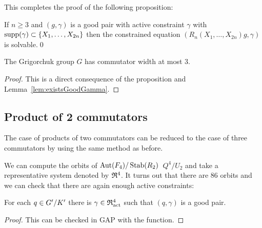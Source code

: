 \documentclass[a4paper,11pt]{amsart}
\newcommand\replace[2]{\st{#1}{\color{Green4}\ #2}}
\begin{document}
This completes the proof of the following proposition:
\begin{pro}\label{pro:solvableConstraintedEquations}
 If $n\geq3$ and $(g,\gamma)$ is a good pair with active constraint $\gamma$ with $\operatorname{{supp}}(\gamma)\subset\{X_1,\dotsc,X_{2n}\}$
 then the constrained equation $(R_n(X_1,\dotsc,X_{2n})g,\gamma)$ is solvable.\qed
\end{pro}
\begin{cor}
 The Grigorchuk group $G$ has commutator width at most $3$.
\end{cor}
\begin{proof}
 This is a direct consequence of the proposition and Lemma~\ref{lem:existsGoodGamma}.
\end{proof}

\subsection{Product of 2 commutators}
The case of products of two commutators can be reduced to the case of three commutators by using the same method as before.

We can compute the orbits of \replace{${\operatorname{{Aut}}(F_4)/\operatorname{Stab}(R_2)}$}{$Q^4/U_2$} and take a representative system denoted by $\mathfrak{R}^4$.
It turns out that there are $86$ orbits and we can check that there are again enough active constraints:
\begin{lem} \label{lem:existsGoodGammaForRed4}
 For each $q\in{G'/K'}$ there is $\gamma\in \mathfrak{R}^4_{\operatorname{act}}$ such that $(q,\gamma)$ is a 
 good pair.
\end{lem}
\begin{proof}
 This can be checked in GAP with the function\newline {}.
\end{proof}
\end{document}
